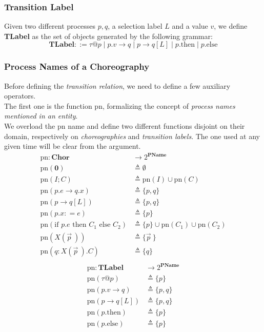\documentclass[12pt,a4paper,twoside]{book}
\makeatletter
\newcommand{\metaDef}{\mathrel{\mathop:}=}
\newcommand{\tlint}[1]{\tau@#1}
\newcommand{\tlthen}[1]{#1\text{.then}}
\newcommand{\tlelse}[1]{#1\text{.else}}
\newcommand{\gencom}{p.e \rightarrow q.x}
\newcommand{\gensel}{p \rightarrow q[L]}
\newcommand{\pn}{\mathrm{pn}}
\makeatother
\begin{document}
\subsubsection{Transition Label}
Given two different processes $p, q$, a selection label $L$ and a value $v$, we define \textbf{TLabel} as the set of objects generated by the following grammar:
$$
\textbf{TLabel} ::= \tlint{p} \mid p.v \rightarrow q \mid \gensel \mid \tlthen{p} \mid \tlelse{p}
$$

\subsubsection{Process Names of a Choreography}
Before defining the \textit{transition relation}, we need to define a few auxiliary operators.\\
The first one is the function $\pn$, formalizing the concept of \textit{process names mentioned in an entity}.\\
We overload the $\pn$ name and define two different functions disjoint on their domain, respectively on \textit{choreographies} and \textit{transition labels}.
The one used at any given time will be clear from the argument.
\begin{align*}
	\pn : \textbf{Chor} &\longrightarrow 2^\textbf{PName}\\
	\pn(\boldsymbol{0}) &\triangleq \emptyset\\
    \pn(I; C) &\triangleq \pn(I) \cup \pn(C)\\
    \pn(\gencom) &\triangleq \{p, q\}\\
    \pn(\gensel) &\triangleq \{p, q\}\\
    \pn(p.x \metaDef e) &\triangleq \{p\}\\
	\pn(\text{if } p.e \text{ then } C_1 \text{ else } C_2) &\triangleq \{p\} \cup \pn(C_1) \cup \pn(C_2)\\
    \pn(X(\vec{p}~)) &\triangleq \{\vec{p}~\}\\
    \pn(q : X(\vec{p}~).C ) &\triangleq \{q\}\\
\end{align*}
\begin{align*}
	\pn : \textbf{TLabel} &\longrightarrow 2^\textbf{PName}\\
	\pn(\tlint{p}) &\triangleq \{ p \}\\
    \pn(p.v \rightarrow q) &\triangleq \{p , q\}\\
    \pn(\gensel) &\triangleq \{p , q\}\\
    \pn(\tlthen{p}) &\triangleq \{ p \}\\
    \pn(\tlelse{p}) &\triangleq \{ p \}\\
\end{align*}
\end{document}

